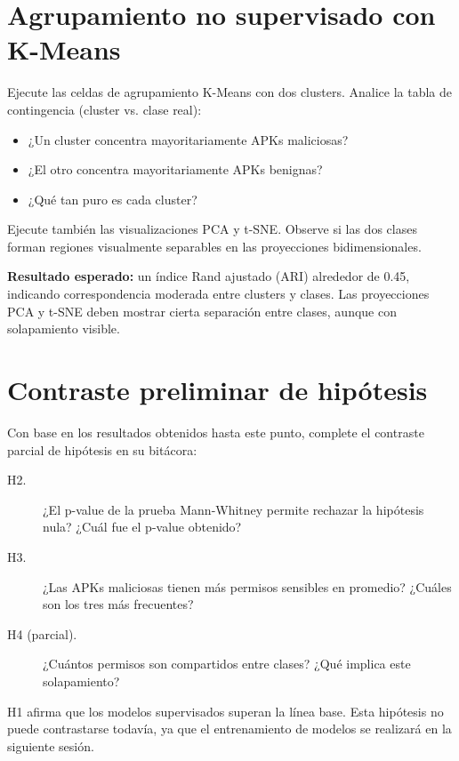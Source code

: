 \documentclass[
  coursetitle={Cómputo Nube y Tecnologías Emergentes},
  coursehours={96},
  coursedate={Verano 2026},
  doctype={Taller},
  otherlangs={english,french},
  authorname={Lázaro},
  authorsurname={Bustio-Martínez},
  authortitle={PhD},
  role={Profesor Investigador},
  email={lbustio@inaoe.mx},
  phone={5559504000},
  ext={7459},
  institution={Instituto Nacional de Astrofísica, Óptica y Electrónica (INAOE)},
  department={Maestría en Ciencias en Tecnologías de Seguridad},
  address={Luis Enrique Erro 1, Sta. Ma. Tonantzintla, San Andrés Cholula, CP 72840, Puebla, México},
  margin={0.5in}
]{../../lbustio_lecture_notes}
\begin{document}
\section{Agrupamiento no supervisado con K-Means}

Ejecute las celdas de agrupamiento K-Means con dos clusters. Analice la tabla de contingencia (cluster vs. clase real):

\begin{itemize}
    \item ¿Un cluster concentra mayoritariamente APKs maliciosas?
    \item ¿El otro concentra mayoritariamente APKs benignas?
    \item ¿Qué tan puro es cada cluster?
\end{itemize}

Ejecute también las visualizaciones PCA y t-SNE. Observe si las dos clases forman regiones visualmente separables en las proyecciones bidimensionales.

\begin{tcolorbox}[title=Punto de control 4]
\textbf{Resultado esperado:} un índice Rand ajustado (ARI) alrededor de 0.45, indicando correspondencia moderada entre clusters y clases. Las proyecciones PCA y t-SNE deben mostrar cierta separación entre clases, aunque con solapamiento visible.
\end{tcolorbox}

\section{Contraste preliminar de hipótesis}

Con base en los resultados obtenidos hasta este punto, complete el contraste parcial de hipótesis en su bitácora:

\begin{description}
    \item[H2.] ¿El p-value de la prueba Mann-Whitney permite rechazar la hipótesis nula? ¿Cuál fue el p-value obtenido?
    \item[H3.] ¿Las APKs maliciosas tienen más permisos sensibles en promedio? ¿Cuáles son los tres más frecuentes?
    \item[H4 (parcial).] ¿Cuántos permisos son compartidos entre clases? ¿Qué implica este solapamiento?
\end{description}

\begin{tcolorbox}[title=Nota sobre H1]
H1 afirma que los modelos supervisados superan la línea base. Esta hipótesis no puede contrastarse todavía, ya que el entrenamiento de modelos se realizará en la siguiente sesión.
\end{tcolorbox}
\end{document}
